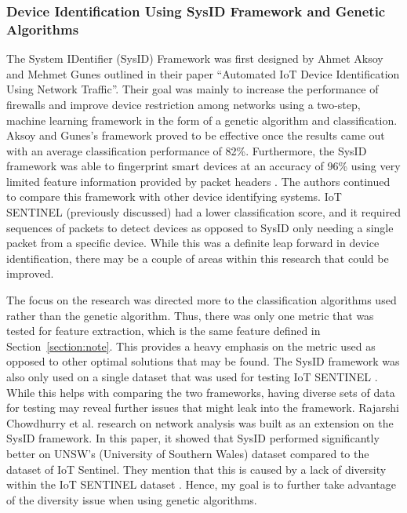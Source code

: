 \documentclass[11pt, titlepage]{article}
\begin{document}
		\subsubsection{Device Identification Using SysID Framework and Genetic Algorithms}
The System IDentifier (SysID) Framework was first designed by Ahmet Aksoy and Mehmet Gunes outlined in their paper “Automated IoT Device Identification Using Network Traffic”. Their goal was mainly to increase the performance of firewalls and improve device restriction among networks using a two-step, machine learning framework in the form of a genetic algorithm and classification. Aksoy and Gunes’s framework proved to be effective once the results came out with an average classification performance of 82\%. Furthermore, the SysID framework was able to fingerprint smart devices at an accuracy of 96\% using very limited feature information provided by packet headers \cite{SysID}. The authors continued to compare this framework with other device identifying systems. IoT SENTINEL (previously discussed) had a lower classification score, and it required sequences of packets to detect devices as opposed to SysID only needing a single packet from a specific device. While this was a definite leap forward in device identification, there may be a couple of areas within this research that could be improved. 

	The focus on the research was directed more to the classification algorithms used rather than the genetic algorithm. Thus, there was only one metric that was tested for feature extraction, which is the same feature defined in Section~\ref{section:note}. This provides a heavy emphasis on the metric used as opposed to other optimal solutions that may be found. The SysID framework was also only used on a single dataset that was used for testing IoT SENTINEL \cite{SysID}. While this helps with comparing the two frameworks, having diverse sets of data for testing may reveal further issues that might leak into the framework. Rajarshi Chowdhurry et al. research on network analysis was built as an extension on the SysID framework. In this paper, it showed that SysID performed significantly better on UNSW’s (University of Southern Wales) dataset compared to the dataset of IoT Sentinel. They mention that this is caused by a lack of diversity within the IoT SENTINEL dataset \cite{Network}. Hence, my goal is to further take advantage of the diversity issue when using genetic algorithms.

		
\end{document}
